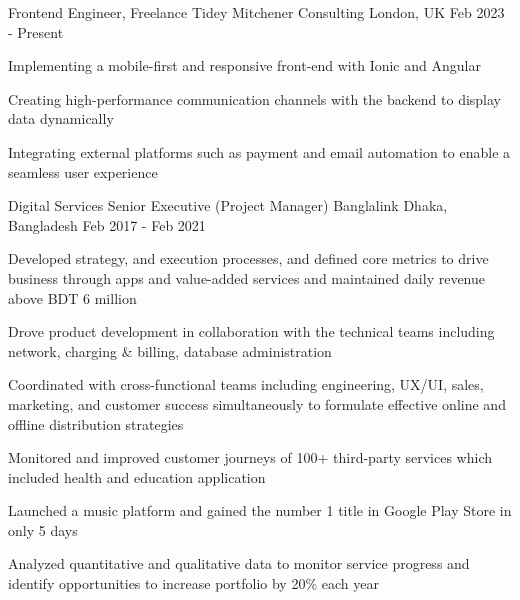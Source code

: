 

\begin{cventries}

  \cventry
    {Frontend Engineer, Freelance} %
    {Tidey Mitchener Consulting} %
    {London, UK} %
    {Feb 2023 - Present} %
    {
      \begin{cvitems} %
        \item {Implementing a mobile-first and responsive front-end with Ionic and Angular}
        \item {Creating high-performance communication channels with the backend to display data dynamically}
        \item {Integrating external platforms such as payment and email automation to enable a seamless user experience}
      \end{cvitems}
    }

  \cventry
    {Digital Services Senior Executive (Project Manager)} %
    {Banglalink} %
    {Dhaka, Bangladesh} %
    {Feb 2017 - Feb 2021} %
    {
      \begin{cvitems} %
        \item {Developed strategy, and execution processes, and defined core metrics to drive business through apps and value-added services and maintained daily revenue above BDT 6 million}
        \item {Drove product development in collaboration with the technical teams including network, charging \& billing, database administration}
        \item {Coordinated with cross-functional teams including engineering, UX/UI, sales, marketing, and customer success simultaneously to formulate effective online and offline distribution strategies}
        \item {Monitored and improved customer journeys of 100+ third-party services which included health and education application}
        \item {Launched a music platform and gained the number 1 title in Google Play Store in only 5 days}
        \item {Analyzed quantitative and qualitative data to monitor service progress and identify opportunities to increase portfolio by 20\% each year}
      \end{cvitems}
    }

\end{cventries}
